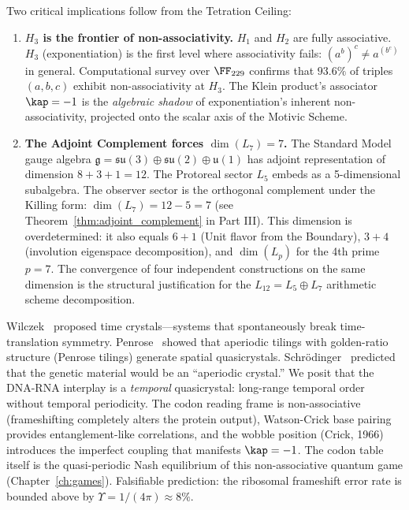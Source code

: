 Two critical implications follow from the Tetration Ceiling:

\begin{enumerate}
\item \textbf{$H_3$ is the frontier of non-associativity.} $H_1$ and $H_2$ are fully associative. $H_3$ (exponentiation) is the first level where associativity fails: $(a^b)^c \neq a^{(b^c)}$ in general. Computational survey over $\FF_{229}$ confirms that $93.6\%$ of triples $(a, b, c)$ exhibit non-associativity at $H_3$. The Klein product's associator $\kap = -1$ is the \emph{algebraic shadow} of exponentiation's inherent non-associativity, projected onto the scalar axis of the Motivic Scheme.

\item \textbf{The Adjoint Complement forces $\dim(L_7) = 7$.} The Standard Model gauge algebra $\mathfrak{g} = \mathfrak{su}(3) \oplus \mathfrak{su}(2) \oplus \mathfrak{u}(1)$ has adjoint representation of dimension $8 + 3 + 1 = 12$. The Protoreal sector $L_5$ embeds as a 5-dimensional subalgebra. The observer sector is the orthogonal complement under the Killing form: $\dim(L_7) = 12 - 5 = 7$ (see Theorem~\ref{thm:adjoint_complement} in Part III). This dimension is overdetermined: it also equals $6 + 1$ (Unit flavor from the Boundary), $3 + 4$ (involution eigenspace decomposition), and $\dim(L_p)$ for the 4th prime $p = 7$. The convergence of four independent constructions on the same dimension is the structural justification for the $L_{12} = L_5 \oplus L_7$ arithmetic scheme decomposition.
\end{enumerate}

\begin{remark}\label{rem:temporal-qc}
Wilczek~\cite{wilczek2012} proposed time crystals---systems that spontaneously break time-translation symmetry. Penrose~\cite{penrose1974} showed that aperiodic tilings with golden-ratio structure (Penrose tilings) generate spatial quasicrystals. Schr\"odinger~\cite{schrodinger1944} predicted that the genetic material would be an ``aperiodic crystal.'' We posit that the DNA-RNA interplay is a \emph{temporal} quasicrystal: long-range temporal order without temporal periodicity. The codon reading frame is non-associative (frameshifting completely alters the protein output), Watson-Crick base pairing provides entanglement-like correlations, and the wobble position (Crick, 1966) introduces the imperfect coupling that manifests $\kap = -1$. The codon table itself is the quasi-periodic Nash equilibrium of this non-associative quantum game (Chapter~\ref{ch:games}). Falsifiable prediction: the ribosomal frameshift error rate is bounded above by $\Upsilon = 1/(4\pi) \approx 8\%$.
\end{remark}

